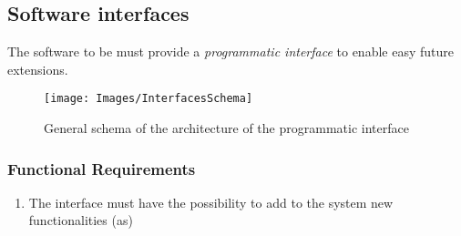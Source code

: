 \pagebreak
\subsection{Software interfaces}
The software to be must provide a \textit{programmatic interface} to enable easy future extensions.

\begin{figure}[H]
\centering
\texttt{[image: Images/InterfacesSchema]}
\caption{General schema of the architecture of the programmatic interface}
\end{figure}

\subsubsection{Functional Requirements}
\begin{enumerate}
\item The interface must have the possibility to add to the system new functionalities (as)
\end{enumerate}